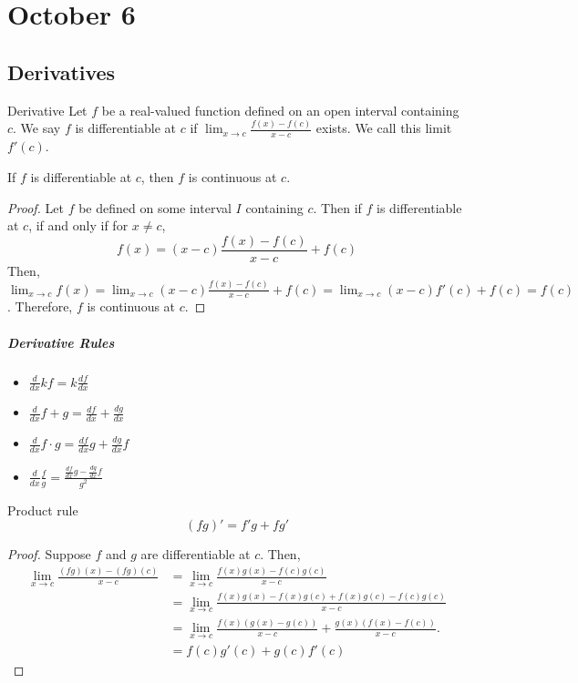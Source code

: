 \chapter{October 6}

\section{Derivatives}
\begin{definition}{Derivative}{}
    Let $f$ be a real-valued function defined on an open interval containing $c$. We say $f$ is differentiable at $c$ if $\lim_{x \to c} \frac{f(x) - f(c)}{x - c}$ exists. We call this limit $f'(c)$.
\end{definition}

\begin{theorem}{}{}
    If $f$ is differentiable at $c$, then $f$ is continuous at $c$.
\end{theorem}
\begin{proof}
    Let $f$ be defined on some interval $I$ containing $c$. Then if $f$ is differentiable at $c$, if and only if for $x \neq c$, $$f(x) = (x - c) \frac{f(x) - f(c)}{x - c} + f(c)$$ Then, $\lim_{x \to c} f(x) = \lim_{x \to c} (x - c) \frac{f(x) - f(c)}{x - c} + f(c) = \lim_{x \to c} (x - c) f'(c) + f(c) = f(c)$. Therefore, $f$ is continuous at $c$.
\end{proof}

\paragraph{Derivative Rules}
\begin{itemize}
    \item $\frac{d}{dx} kf = k \frac{df}{dx}$
    \item $\frac{d}{dx} f + g = \frac{df}{dx} + \frac{dg}{dx}$
    \item $\frac{d}{dx} f \cdot g = \frac{df}{dx} g + \frac{dg}{dx} f$
    \item $\frac{d}{dx} \frac{f}{g} = \frac{\frac{df}{dx} g - \frac{dg}{dx} f}{g^2}$
\end{itemize}

\begin{theorem}{Product rule}{}
    $$(fg)' = f'g + fg'$$
\end{theorem}
\begin{proof}
    Suppose $f$ and $g$ are differentiable at $c$. Then,
    \begin{align*}
        \lim_{x \to c} \frac{(fg)(x) - (fg)(c)}{x - c} &= \lim_{x \to c} \frac{f(x)g(x) - f(c)g(c)}{x - c} \\
        &= \lim_{x \to c} \frac{f(x)g(x) - f(x)g(c) + f(x)g(c) - f(c)g(c)}{x - c} \\
        &= \lim_{x \to c} \frac{f(x) (g(x) - g(c))}{x - c} + \frac{g(x) (f(x) - f(c))}{x - c}. \\
        &= f(c)g'(c) + g(c)f'(c)
    \end{align*}
\end{proof}

